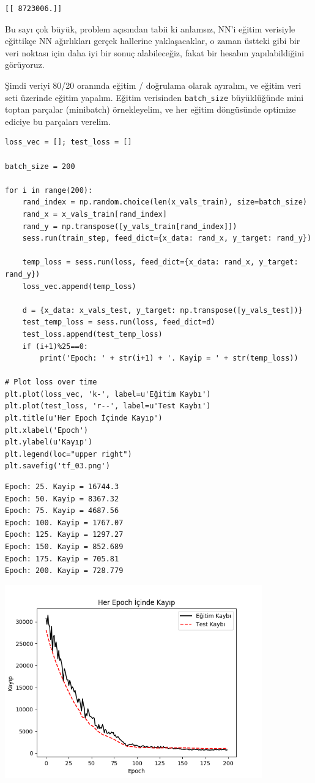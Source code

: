 \documentclass[12pt,fleqn]{article}\usepackage{../../common}
\begin{document}
\begin{verbatim}
[[ 8723006.]]
\end{verbatim}

Bu sayı çok büyük, problem açısından tabii ki anlamsız, NN'i eğitim
verisiyle eğittikçe NN ağırlıkları gerçek hallerine yaklaşacaklar, o zaman
üstteki gibi bir veri noktası için daha iyi bir sonuç alabileceğiz, fakat
bir hesabın yapılabildiğini görüyoruz.

Şimdi veriyi 80/20 oranında eğitim / doğrulama olarak ayıralım, ve eğitim
veri seti üzerinde eğitim yapalım. Eğitim verisinden \verb!batch_size!
büyüklüğünde mini toptan parçalar (minibatch) örnekleyelim, ve her eğitim
döngüsünde optimize ediciye bu parçaları verelim.

\begin{verbatim}
loss_vec = []; test_loss = []

batch_size = 200

for i in range(200):
    rand_index = np.random.choice(len(x_vals_train), size=batch_size)
    rand_x = x_vals_train[rand_index]
    rand_y = np.transpose([y_vals_train[rand_index]])
    sess.run(train_step, feed_dict={x_data: rand_x, y_target: rand_y})

    temp_loss = sess.run(loss, feed_dict={x_data: rand_x, y_target: rand_y})
    loss_vec.append(temp_loss)

    d = {x_data: x_vals_test, y_target: np.transpose([y_vals_test])}
    test_temp_loss = sess.run(loss, feed_dict=d)
    test_loss.append(test_temp_loss)
    if (i+1)%25==0:
        print('Epoch: ' + str(i+1) + '. Kayip = ' + str(temp_loss))

# Plot loss over time
plt.plot(loss_vec, 'k-', label=u'Eğitim Kaybı')
plt.plot(test_loss, 'r--', label=u'Test Kaybı')
plt.title(u'Her Epoch İçinde Kayıp')
plt.xlabel('Epoch')
plt.ylabel(u'Kayıp')
plt.legend(loc="upper right")
plt.savefig('tf_03.png')
\end{verbatim}

\begin{verbatim}
Epoch: 25. Kayip = 16744.3
Epoch: 50. Kayip = 8367.32
Epoch: 75. Kayip = 4687.56
Epoch: 100. Kayip = 1767.07
Epoch: 125. Kayip = 1297.27
Epoch: 150. Kayip = 852.689
Epoch: 175. Kayip = 705.81
Epoch: 200. Kayip = 728.779
\end{verbatim}

\includegraphics[width=30em]{tf_03.png}
\end{document}
